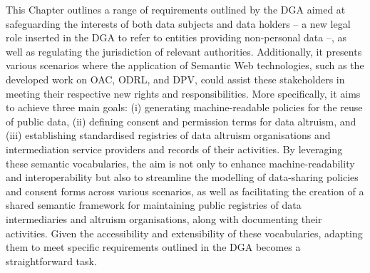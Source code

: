 This Chapter outlines a range of requirements outlined by the DGA aimed at safeguarding the interests of both data subjects and data holders -- a new legal role inserted in the DGA to refer to entities providing non-personal data --, as well as regulating the jurisdiction of relevant authorities. 
Additionally, it presents various scenarios where the application of Semantic Web technologies, such as the developed work on OAC, ODRL, and DPV, could assist these stakeholders in meeting their respective new rights and responsibilities.
More specifically, it aims to achieve three main goals: (i) generating machine-readable policies for the reuse of public data, (ii) defining consent and permission terms for data altruism, and (iii) establishing standardised registries of data altruism organisations and intermediation service providers and records of their activities.
By leveraging these semantic vocabularies, the aim is not only to enhance machine-readability and interoperability but also to streamline the modelling of data-sharing policies and consent forms across various scenarios, as well as facilitating the creation of a shared semantic framework for maintaining public registries of data intermediaries and altruism organisations, along with documenting their activities.
Given the accessibility and extensibility of these vocabularies, adapting them to meet specific requirements outlined in the DGA becomes a straightforward task.

% 
% 
% 
% 




